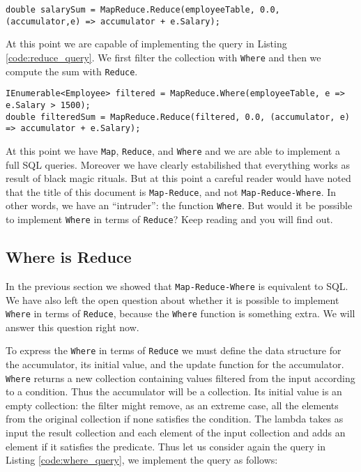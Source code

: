 \begin{lstlisting}
double salarySum = MapReduce.Reduce(employeeTable, 0.0, (accumulator,e) => accumulator + e.Salary);
\end{lstlisting}

\noindent
At this point we are capable of implementing the query in Listing \ref{code:reduce_query}. We first filter the collection with \texttt{Where} and then we compute the sum with \texttt{Reduce}.

\begin{lstlisting}
IEnumerable<Employee> filtered = MapReduce.Where(employeeTable, e => e.Salary > 1500);
double filteredSum = MapReduce.Reduce(filtered, 0.0, (accumulator, e) => accumulator + e.Salary);
\end{lstlisting}

At this point we have \texttt{Map}, \texttt{Reduce}, and \texttt{Where} and we are able to implement a full SQL queries. Moreover we have clearly estabilished that everything works as result of black magic rituals. But at this point a careful reader would have noted that the title of this document is \texttt{Map-Reduce}, and not \texttt{Map-Reduce-Where}. In other words, we have an ``intruder'': the function \texttt{Where}. But would it be possible to implement \texttt{Where} in terms of \texttt{Reduce}? Keep reading and you will find out.

\subsection{Where is Reduce}
In the previous section we showed that \texttt{Map-Reduce-Where} is equivalent to SQL. We have also left the open question about whether it is possible to implement \texttt{Where} in terms of \texttt{Reduce}, because the \texttt{Where} function is something extra. We will answer this question right now.

To express the \texttt{Where} in terms of \texttt{Reduce} we must define the data structure for the accumulator, its initial value, and the update function for the accumulator. \texttt{Where} returns a new collection containing values filtered from the input according to a condition. Thus the accumulator will be a collection. Its initial value is an empty collection: the filter might remove, as an extreme case, all the elements from the original collection if none satisfies the condition. The lambda takes as input the result collection and each element of the input collection and adds an element if it satisfies the predicate. Thus let us consider again the query in Listing \ref{code:where_query}, we implement the query as follows:

